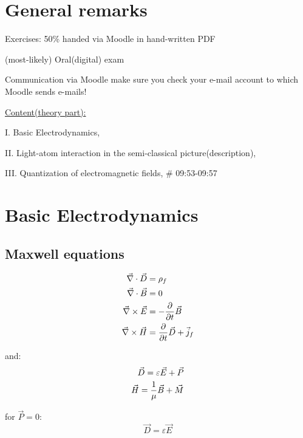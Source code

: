 


    \setcounter{section}{-1}
    \section{General remarks}
        Exercises: 50\% handed via Moodle in hand-written PDF

        (most-likely) Oral(digital) exam

        Communication via Moodle make sure you check your e-mail account to which Moodle sends e-mails!

        \underline{Content(theory part):}

        I. Basic Electrodynamics,

        II. Light-atom interaction in the semi-classical picture(description),

        III. Quantization of electromagnetic fields,
        \# 09:53-09:57






    \section{Basic Electrodynamics}
    \setcounter{subsection}{-1}
        \subsection{Maxwell equations}
            $$
            \begin{aligned}
                \vec{\nabla} \cdot \vec{D} &= \rho_f \nonumber \\ 
                \vec{\nabla} \cdot \vec{B} &= 0 \nonumber \\ 
                \vec{\nabla} \times \vec{E} &= - \frac{\partial}{\partial t} \vec{B} \nonumber \\ 
                \vec{\nabla} \times \vec{H} &= \frac{\partial}{\partial t} \vec{D} + \vec{j}_f \nonumber \\ 
            \end{aligned}
            $$

            and:
            $$
            \begin{aligned}
                \vec{D} = \varepsilon \vec{E} + \vec{P} \nonumber \\ 
                \vec{H} = \frac{1}{\mu} \vec{B} + \vec{M} \nonumber \\ 
            \end{aligned}
            $$

            for $\vec{P} = 0$:
            $$
            \vec{D} = \varepsilon \vec{E}
            $$


